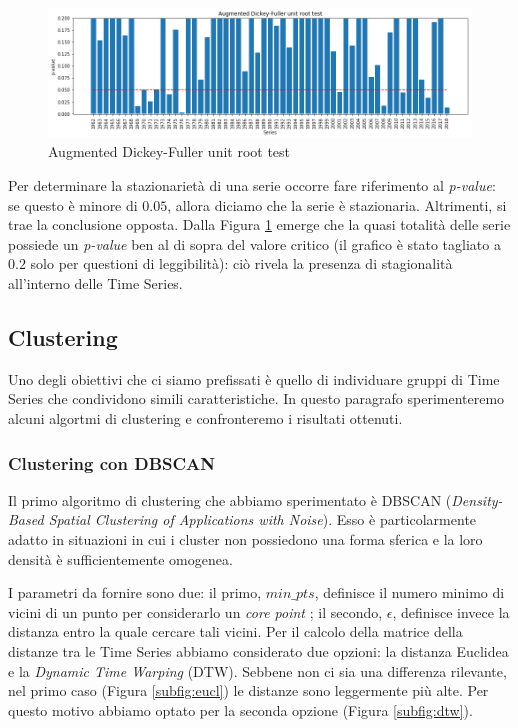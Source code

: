 \documentclass[a4paper]{article}
\begin{document}
\begin{figure}[h]
	\includegraphics[width=\textwidth]{images/dickey_fuller.png}
	\caption{Augmented Dickey-Fuller unit root test}
	\label{fig:dickey_fuller}
\end{figure}

Per determinare la stazionarietà di una serie occorre fare riferimento al \textit{p-value}: se questo è minore di $0.05$, allora diciamo che la serie è stazionaria. Altrimenti, si trae la conclusione opposta. Dalla Figura \ref{fig:dickey_fuller} emerge che la quasi totalità delle serie possiede un \textit{p-value} ben al di sopra del valore critico (il grafico è stato tagliato a $0.2$ solo per questioni di leggibilità): ciò rivela la presenza di stagionalità all'interno delle Time Series.

\subsection{Clustering}

Uno degli obiettivi che ci siamo prefissati è quello di individuare gruppi di Time Series che condividono simili caratteristiche. In questo paragrafo sperimenteremo alcuni algortmi di clustering e confronteremo i risultati ottenuti.

\subsubsection{Clustering con DBSCAN}

Il primo algoritmo di clustering che abbiamo sperimentato è DBSCAN (\textit{Density-Based Spatial Clustering of Applications with Noise}). Esso è particolarmente adatto in situazioni in cui i cluster non possiedono una forma sferica e la loro densità è sufficientemente omogenea.

I parametri da fornire sono due: il primo, $min\_pts$, definisce il numero minimo di vicini di un punto per considerarlo un \textit{core point} \cite{dbscan}; il secondo, $\epsilon$, definisce invece la distanza entro la quale cercare tali vicini. Per il calcolo della matrice della distanze tra le Time Series abbiamo considerato due opzioni: la distanza Euclidea e la \textit{Dynamic Time Warping} (DTW). Sebbene non ci sia una differenza rilevante, nel primo caso (Figura \ref{subfig:eucl}) le distanze sono leggermente più alte. Per questo motivo abbiamo optato per la seconda opzione (Figura \ref{subfig:dtw}).
\end{document}
